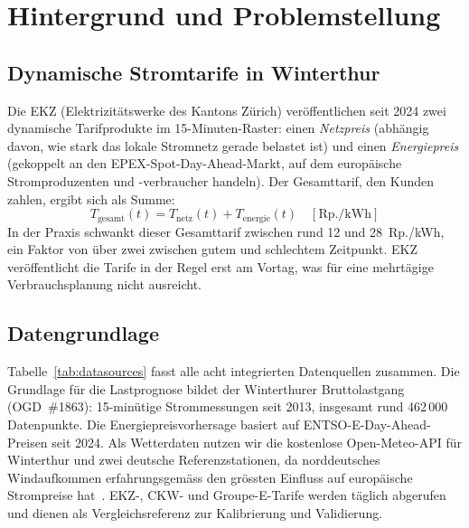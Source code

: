 \documentclass[sigconf]{acmart}
\begin{document}
\section{Hintergrund und Problemstellung}

\subsection{Dynamische Stromtarife in Winterthur}

Die EKZ (Elektrizit\"atswerke des Kantons Z\"urich) ver\"offentlichen seit 2024
zwei dynamische Tarifprodukte im 15-Minuten-Raster: einen \emph{Netzpreis}
(abh\"angig davon, wie stark das lokale Stromnetz gerade belastet ist) und einen
\emph{Energiepreis} (gekoppelt an den EPEX-Spot-Day-Ahead-Markt, auf dem
europ\"aische Stromproduzenten und -verbraucher handeln).
Der Gesamttarif, den Kunden zahlen, ergibt sich als Summe:
\begin{equation}
  T_{\mathrm{gesamt}}(t) = T_{\mathrm{netz}}(t) + T_{\mathrm{energie}}(t)
  \quad [\text{Rp./kWh}]
  \label{eq:tariff}
\end{equation}
In der Praxis schwankt dieser Gesamttarif zwischen rund 12 und 28~Rp./kWh,
ein Faktor von \"uber zwei zwischen gutem und schlechtem Zeitpunkt.
EKZ ver\"offentlicht die Tarife in der Regel erst am Vortag, was f\"ur eine
mehrt\"agige Verbrauchsplanung nicht ausreicht.

\subsection{Datengrundlage}

Tabelle~\ref{tab:datasources} fasst alle acht integrierten Datenquellen zusammen.
Die Grundlage f\"ur die Lastprognose bildet der Winterthurer Bruttolastgang
(OGD~\#1863): 15-min\"utige Strommessungen seit 2013, insgesamt rund 462\,000
Datenpunkte.
Die Energiepreisvorhersage basiert auf ENTSO-E-Day-Ahead-Preisen seit 2024.
Als Wetterdaten nutzen wir die kostenlose Open-Meteo-API f\"ur Winterthur und
zwei deutsche Referenzstationen, da norddeutsches Windaufkommen erfahrungs\-gem\"ass
den gr\"ossten Einfluss auf europ\"aische Strompreise hat~\cite{Lago2021}.
EKZ-, CKW- und Groupe-E-Tarife werden t\"aglich abgerufen und dienen als
Vergleichsreferenz zur Kalibrierung und Validierung.
\end{document}
